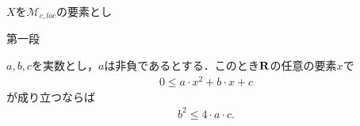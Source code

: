 	\begin{sketch}
		
	\end{sketch}
	
	\begin{screen}
		\begin{thm}[有界変動な局所マルチンゲールは定数]
			$X$を$\mathscr{M}_{c,loc}$の要素とし
		\end{thm}
	\end{screen}
	
	\begin{sketch}\mbox{}
		\begin{description}
			\item[第一段]
				
		\end{description}
	\end{sketch}
	
	\begin{screen}
	\end{screen}
	
	\begin{screen}
		\begin{thm}[二次関数が非負であるための条件]
		\label{thm:nonnegative_condition_of_quadratic_function}
			$a,b,c$を実数とし，$a$は非負であるとする．このとき$\mathbf{R}$の任意の要素$x$で
			\begin{align}
				0 \leq a \cdot x^{2} + b \cdot x + c
				\label{fom:nonnegative_condition_of_quadratic_function}
			\end{align}
			が成り立つならば
			\begin{align}
				b^{2} \leq 4 \cdot a \cdot c.
			\end{align}
		\end{thm}
	\end{screen}
	
